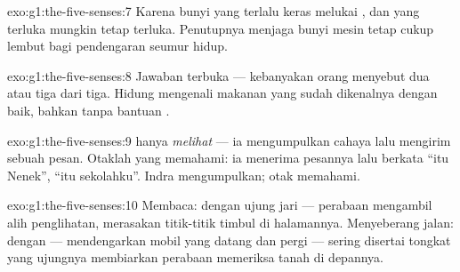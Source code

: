 \begin{solution}{exo:g1:the-five-senses:7}
Karena bunyi yang terlalu keras melukai , dan  yang
terluka mungkin tetap terluka. Penutupnya menjaga bunyi mesin tetap
cukup lembut bagi pendengaran seumur hidup.
\end{solution}

\begin{solution}{exo:g1:the-five-senses:8}
Jawaban terbuka --- kebanyakan orang menyebut dua atau tiga dari tiga.
Hidung mengenali makanan yang sudah dikenalnya dengan baik, bahkan
tanpa bantuan .
\end{solution}

\begin{solution}{exo:g1:the-five-senses:9}
 hanya \emph{melihat} --- ia mengumpulkan cahaya lalu mengirim
sebuah pesan. Otaklah yang memahami: ia menerima pesannya lalu berkata
``itu Nenek'', ``itu sekolahku''. Indra mengumpulkan; otak memahami.
\end{solution}

\begin{solution}{exo:g1:the-five-senses:10}
Membaca: dengan ujung jari --- perabaan mengambil alih penglihatan,
merasakan titik-titik timbul di halamannya. Menyeberang jalan: dengan
 --- mendengarkan mobil yang datang dan pergi --- sering
disertai tongkat yang ujungnya membiarkan perabaan memeriksa tanah di
depannya.
\end{solution}
